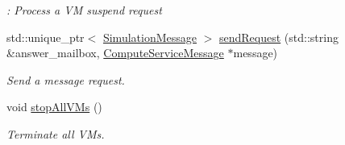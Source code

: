 \begin{DoxyCompactItemize}
\begin{DoxyCompactList}\small\item\em \+: Process a VM suspend request \end{DoxyCompactList}\item 
std\+::unique\+\_\+ptr$<$ \hyperlink{classwrench_1_1_simulation_message}{Simulation\+Message} $>$ \hyperlink{classwrench_1_1_cloud_service_af08b67428674be19d86a6ff5c8afcf0e}{send\+Request} (std\+::string \&answer\+\_\+mailbox, \hyperlink{classwrench_1_1_compute_service_message}{Compute\+Service\+Message} $\ast$message)
\begin{DoxyCompactList}\small\item\em Send a message request. \end{DoxyCompactList}\item 
\mbox{\label{classwrench_1_1_cloud_service_a69daa34a318cb780c0b9ad14516b097d}} 
void \hyperlink{classwrench_1_1_cloud_service_a69daa34a318cb780c0b9ad14516b097d}{stop\+All\+V\+Ms} ()
\begin{DoxyCompactList}\small\item\em Terminate all V\+Ms. \end{DoxyCompactList}\end{DoxyCompactItemize}
